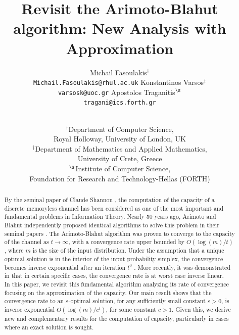 \documentclass[11pt, letterpaper]{article}
\begin{document}
\title{Revisit the Arimoto-Blahut algorithm: New Analysis with Approximation}

\author{
    Michail Fasoulakis${}^{\dagger}$ \\ \texttt{Michail.Fasoulakis@rhul.ac.uk} \And Konstantinos Varsos${}^{\ddagger}$ \\ \texttt{varsosk@uoc.gr} \And Apostolos Traganitis${}^{\S}$ \\
    \texttt{tragani@ics.forth.gr} \and \\
     ${}^{\dagger}$Department of Computer Science, \\Royal Holloway, University of London, UK  \\
     ${}^{\ddagger}$Department of Mathematics and Applied Mathematics, \\
    University of Crete, Greece  
    \\
    ${}^{\S}$Institute of Computer Science,\\ 
 Foundation for Research and Technology-Hellas (FORTH)
}

\date{}

\maketitle
\begin{abstract}
By the seminal paper of Claude Shannon \cite{Shannon48}, the computation of the capacity of a discrete memoryless channel has been considered as one of the most important and fundamental problems in Information Theory. Nearly 50 years ago, Arimoto and Blahut independently proposed identical algorithms to solve this problem in their seminal papers \cite{Arimoto1972AnAF, Blahut1972ComputationOC}. The Arimoto-Blahut algorithm was proven to converge to the capacity of the channel as $t \to \infty$, with a convergence rate upper bounded by $O\left(\log(m)/t\right)$, where $m$ is the size of the input distribution. Under the assumption that a unique optimal solution is in the interior of the input probability simplex, the convergence becomes inverse exponential after an iteration $t^0$ \cite{Arimoto1972AnAF}. More recently, it was demonstrated in \cite{Nakagawa2020AnalysisOT} that in certain specific cases, the convergence rate is at worst case inverse linear.\\
In this paper, we revisit this fundamental algorithm analyzing its rate of convergence focusing on the approximation of the capacity. Our main result shows that the convergence rate to an $\varepsilon$-optimal solution, for any sufficiently small constant $\varepsilon > 0$, is inverse exponential $O\left(\log(m)/c^t\right)$, for some constant $c > 1$. Given this, we derive new and complementary results for the computation of capacity, particularly in cases where an exact solution is sought.
\end{abstract}
\end{document}
